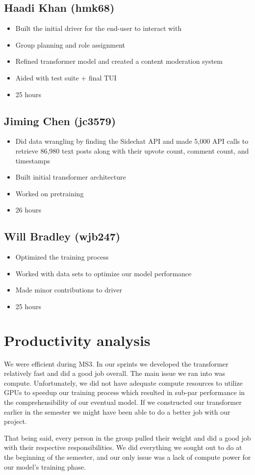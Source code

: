 \documentclass[11pt]{article}
\begin{document}
\subsection{Haadi Khan (hmk68)}
\label{sec:org5f91cba}
\begin{itemize}
\item Built the initial driver for the end-user to interact with
\item Group planning and role assignment
\item Refined transformer model and created a content moderation system
\item Aided with test suite + final TUI
\item 25 hours
\end{itemize}
\subsection{Jiming Chen (jc3579)}
\label{sec:orgec1db26}
\begin{itemize}
\item Did data wrangling by finding the Sidechat API and made 5,000 API calls to retrieve 86,980 text posts along with their upvote count, comment count, and timestamps
\item Built initial transformer architecture
\item Worked on pretraining
\item 26 hours
\end{itemize}
\subsection{Will Bradley (wjb247)}
\label{sec:org63815ce}
\begin{itemize}
\item Optimized the training process
\item Worked with data sets to optimize our model performance
\item Made minor contributions to driver
\item 25 hours
\end{itemize}
\section{Productivity analysis}
\label{sec:orgea04c50}
We were efficient during MS3. In our sprints we developed the transformer relatively fast and did a good job overall. The main issue we ran into was compute. Unfortunately, we did not have adequate compute resources to utilize GPUs to speedup our training process which resulted in sub-par performance in the comprehensibility of our eventual model. If we constructed our transformer earlier in the semester we might have been able to do a better job with our project.

That being said, every person in the group pulled their weight and did a good job with their respective responsibilities. We did everything we sought out to do at the beginning of the semester, and our only issue was a lack of compute power for our model's training phase.
\end{document}
